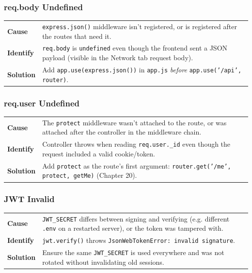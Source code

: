\subsubsection*{req.body Undefined}
\noindent\begin{tabularx}{\textwidth}{@{}>{\bfseries}p{2.3cm}X@{}}
\toprule
Cause & \texttt{express.json()} middleware isn't registered, or is
registered after the routes that need it. \\
Identify & \texttt{req.body} is \texttt{undefined} even though the
frontend sent a JSON payload (visible in the Network tab request body). \\
Solution & Add \texttt{app.use(express.json())} in \texttt{app.js}
\emph{before} \texttt{app.use('/api', router)}. \\
\bottomrule
\end{tabularx}

\subsubsection*{req.user Undefined}
\noindent\begin{tabularx}{\textwidth}{@{}>{\bfseries}p{2.3cm}X@{}}
\toprule
Cause & The \texttt{protect} middleware wasn't attached to the route, or
was attached after the controller in the middleware chain. \\
Identify & Controller throws when reading \texttt{req.user.\_id} even
though the request included a valid cookie/token. \\
Solution & Add \texttt{protect} as the route's first argument:
\texttt{router.get('/me', protect, getMe)} (Chapter 20). \\
\bottomrule
\end{tabularx}

\subsubsection*{JWT Invalid}
\noindent\begin{tabularx}{\textwidth}{@{}>{\bfseries}p{2.3cm}X@{}}
\toprule
Cause & \texttt{JWT\_SECRET} differs between signing and verifying (e.g.
different \texttt{.env} on a restarted server), or the token was
tampered with. \\
Identify & \texttt{jwt.verify()} throws
\texttt{JsonWebTokenError: invalid signature}. \\
Solution & Ensure the same \texttt{JWT\_SECRET} is used everywhere and
was not rotated without invalidating old sessions. \\
\bottomrule
\end{tabularx}

